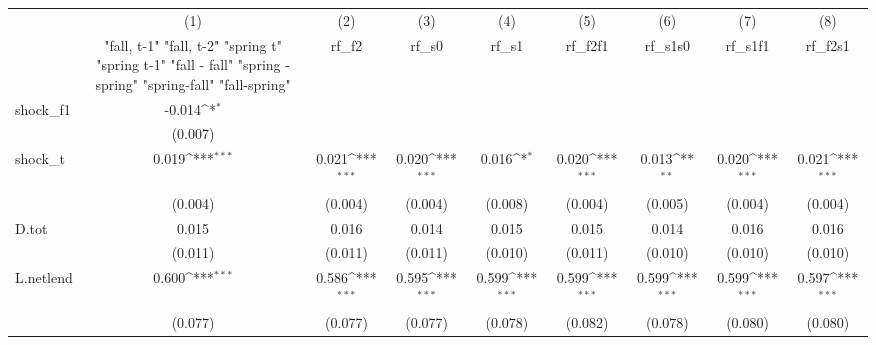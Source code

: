 {
\def\sym#1{\ifmmode^{#1}\else\(^{#1}\)\fi}
\begin{tabular}{l*{8}{c}}
\toprule
            &\multicolumn{1}{c}{(1)}&\multicolumn{1}{c}{(2)}&\multicolumn{1}{c}{(3)}&\multicolumn{1}{c}{(4)}&\multicolumn{1}{c}{(5)}&\multicolumn{1}{c}{(6)}&\multicolumn{1}{c}{(7)}&\multicolumn{1}{c}{(8)}\\
            &\multicolumn{1}{c}{  "fall, t-1" "fall, t-2" "spring t" "spring t-1"  "fall - fall" "spring - spring" "spring-fall" "fall-spring" }&\multicolumn{1}{c}{rf\_f2}&\multicolumn{1}{c}{rf\_s0}&\multicolumn{1}{c}{rf\_s1}&\multicolumn{1}{c}{rf\_f2f1}&\multicolumn{1}{c}{rf\_s1s0}&\multicolumn{1}{c}{rf\_s1f1}&\multicolumn{1}{c}{rf\_f2s1}\\
\midrule
shock\_f1    &      -0.014\sym{*}  &                     &                     &                     &                     &                     &                     &                     \\
            &     (0.007)         &                     &                     &                     &                     &                     &                     &                     \\
\addlinespace
shock\_t     &       0.019\sym{***}&       0.021\sym{***}&       0.020\sym{***}&       0.016\sym{*}  &       0.020\sym{***}&       0.013\sym{**} &       0.020\sym{***}&       0.021\sym{***}\\
            &     (0.004)         &     (0.004)         &     (0.004)         &     (0.008)         &     (0.004)         &     (0.005)         &     (0.004)         &     (0.004)         \\
\addlinespace
D.tot       &       0.015         &       0.016         &       0.014         &       0.015         &       0.015         &       0.014         &       0.016         &       0.016         \\
            &     (0.011)         &     (0.011)         &     (0.011)         &     (0.010)         &     (0.011)         &     (0.010)         &     (0.010)         &     (0.010)         \\
\addlinespace
L.netlend   &       0.600\sym{***}&       0.586\sym{***}&       0.595\sym{***}&       0.599\sym{***}&       0.599\sym{***}&       0.599\sym{***}&       0.599\sym{***}&       0.597\sym{***}\\
            &     (0.077)         &     (0.077)         &     (0.077)         &     (0.078)         &     (0.082)         &     (0.078)         &     (0.080)         &     (0.080)         \\

\end{tabular}}
